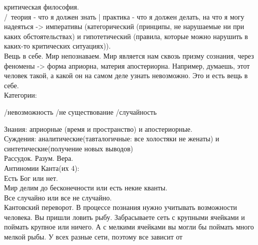 \documentclass[a4paper,12pt]{report} %
\begin{document}
\begin{itemize}
  критическая философия.\\
  /\
  теория - что я должен знать | практика - что я должен делать, на что я
  могу надеяться -> императивы (категорический (принципы, не нарушаемые
  ни при каких обстоятельствах) и гипотетический (правила, которые можно
  нарушить в каких-то критических ситуациях)).\\
  Вещь в себе. Мир непознаваем. Мир является нам сквозь призму сознания,
  через феномены -> форма априорна, материя апостериорна. Например,
  думаешь, этот человек такой, а какой он на самом деле узнать
  невозможно. Это и есть вещь в себе.\\
  Категории:\\
  \begin{enumerate}
    \begin{enumerate}
    \end{enumerate}
    \begin{enumerate}
    \end{enumerate}
    \begin{enumerate}
    \end{enumerate}
    \begin{enumerate}
    /невозможность 
    /не существование 
    /случайность
    \end{enumerate}
  \end{enumerate}
  Знания: априорные (время и пространство) и апостериорные.\\
  Суждения: аналитические(тавталогичные: все холостяки не женаты) и
  синтетические(получение новых выводов)\\
  Рассудок. Разум. Вера. \\
  Антиномии Канта(их 4):\\
  Есть Бог или нет.\\
  Мир делим до бесконечности или есть некие кванты.\\
  Все случайно или все не случайно.\\
  Кантовский переворот. В процессе познания нужно учитывать возможности
  человека. Вы пришли ловить рыбу. Забрасываете сеть с крупными ячейками
  и поймать крупное или ничего. А с мелкими ячейками вы могли бы поймать
  много мелкой рыбы. У всех разные сети, поэтому все зависит от

\end{itemize}
\end{document}
